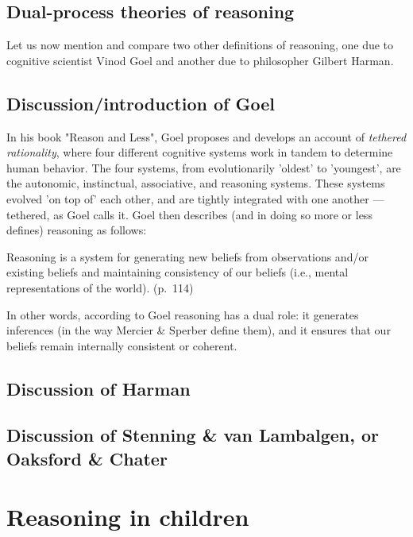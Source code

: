 \subsection{Dual-process theories of reasoning}
Let us now mention and compare two other definitions of reasoning, one due to cognitive scientist Vinod Goel and another due to philosopher Gilbert Harman.

\subsection{Discussion/introduction of Goel}
In his \citeyear{Goel22} book "Reason and Less", Goel proposes and develops an account of \emph{tethered rationality}, where four different cognitive systems work in tandem to determine human behavior. The four systems, from evolutionarily 'oldest' to 'youngest', are the autonomic, instinctual, associative, and reasoning systems. These systems evolved 'on top of' each other, and are tightly integrated with one another --- tethered, as Goel calls it.
Goel then describes (and in doing so more or less defines) reasoning as follows:
\begin{quoting}
    Reasoning is a system for generating new beliefs from observations and/or existing beliefs and maintaining consistency of our beliefs (i.e., mental representations of the world).
    \hfill (p.~114)
\end{quoting}
In other words, according to Goel reasoning has a dual role: it generates inferences (in the way Mercier \& Sperber define them), and it ensures that our beliefs remain internally consistent or coherent.
\subsection{Discussion of Harman}
\subsection{Discussion of Stenning \& van Lambalgen, or Oaksford \& Chater}

\section{Reasoning in children}
\label{sec:reasoning-dev}

